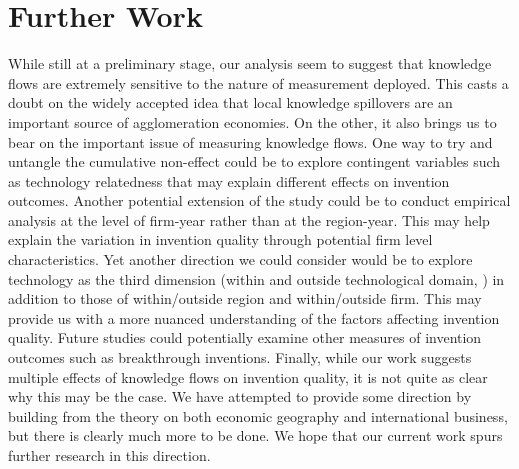 \documentclass[12pt,letterpaper]{article}
\begin{document}
\section*{Further Work}
While still at a preliminary stage, our analysis seem to suggest that knowledge flows are extremely sensitive to the nature of measurement deployed. This casts a doubt on the widely accepted idea that local knowledge spillovers are an important source of agglomeration economies. On the other, it also brings us to bear on the important issue of measuring knowledge flows. One way to try and untangle the cumulative non-effect could be to explore contingent variables such as technology relatedness that may explain different effects on invention outcomes. Another potential extension of the study could be to conduct empirical analysis at the level of firm-year rather than at the region-year. This may help explain the variation in invention quality through potential firm level characteristics. Yet another direction we could consider would be to explore technology as the third dimension (within and outside technological domain, \cite{Rosenkopf2001}) in addition to those of within/outside region and within/outside firm. This may provide us with a more nuanced understanding of the factors affecting invention quality. Future studies could potentially examine other measures of invention outcomes such as breakthrough inventions. Finally, while our work suggests multiple effects of knowledge flows on invention quality, it is not quite as clear why this may be the case. We have attempted to provide some direction by building from the theory on both economic geography and international business, but there is clearly much more to be done. We hope that our current work spurs further research in this direction.  


\newpage
\renewcommand{\refname}{REFERENCES}
\singlespacing
 

\newpage
\normalsize
\doublespacing

\appendix
\end{document}
